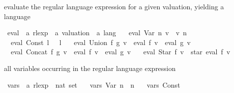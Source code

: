 \begin{isabellebody}
\begin{isamarkuptext}
evaluate the regular language expression for a given valuation, yielding a language%
\end{isamarkuptext}\isamarkuptrue%
\isamarkupfalse%
\ eval\ {\isacharcolon}{\kern0pt}{\isacharcolon}{\kern0pt}\ {\isachardoublequoteopen}{\isacharprime}{\kern0pt}a\ rlexp\ {\isasymRightarrow}\ {\isacharprime}{\kern0pt}a\ valuation\ {\isasymRightarrow}\ {\isacharprime}{\kern0pt}a\ lang{\isachardoublequoteclose}\ \isanewline
\ \ {\isachardoublequoteopen}eval\ {\isacharparenleft}{\kern0pt}Var\ n{\isacharparenright}{\kern0pt}\ v\ {\isacharequal}{\kern0pt}\ v\ n{\isachardoublequoteclose}\ {\isacharbar}{\kern0pt}\isanewline
\ \ {\isachardoublequoteopen}eval\ {\isacharparenleft}{\kern0pt}Const\ l{\isacharparenright}{\kern0pt}\ {\isacharunderscore}{\kern0pt}\ {\isacharequal}{\kern0pt}\ l{\isachardoublequoteclose}\ {\isacharbar}{\kern0pt}\isanewline
\ \ {\isachardoublequoteopen}eval\ {\isacharparenleft}{\kern0pt}Union\ f\ g{\isacharparenright}{\kern0pt}\ v\ {\isacharequal}{\kern0pt}\ eval\ f\ v\ {\isasymunion}\ eval\ g\ v{\isachardoublequoteclose}\ {\isacharbar}{\kern0pt}\isanewline
\ \ {\isachardoublequoteopen}eval\ {\isacharparenleft}{\kern0pt}Concat\ f\ g{\isacharparenright}{\kern0pt}\ v\ {\isacharequal}{\kern0pt}\ eval\ f\ v\ {\isacharat}{\kern0pt}{\isacharat}{\kern0pt}\ eval\ g\ v{\isachardoublequoteclose}\ {\isacharbar}{\kern0pt}\isanewline
\ \ {\isachardoublequoteopen}eval\ {\isacharparenleft}{\kern0pt}Star\ f{\isacharparenright}{\kern0pt}\ v\ {\isacharequal}{\kern0pt}\ star\ {\isacharparenleft}{\kern0pt}eval\ f\ v{\isacharparenright}{\kern0pt}{\isachardoublequoteclose}%
\begin{isamarkuptext}%
all variables occurring in the regular language expression%
\end{isamarkuptext}\isamarkuptrue%
\isamarkupfalse%
\ vars\ {\isacharcolon}{\kern0pt}{\isacharcolon}{\kern0pt}\ {\isachardoublequoteopen}{\isacharprime}{\kern0pt}a\ rlexp\ {\isasymRightarrow}\ nat\ set{\isachardoublequoteclose}\ \isanewline
\ \ {\isachardoublequoteopen}vars\ {\isacharparenleft}{\kern0pt}Var\ n{\isacharparenright}{\kern0pt}\ {\isacharequal}{\kern0pt}\ {\isacharbraceleft}{\kern0pt}n{\isacharbraceright}{\kern0pt}{\isachardoublequoteclose}\ {\isacharbar}{\kern0pt}\isanewline
\ \ {\isachardoublequoteopen}vars\ {\isacharparenleft}{\kern0pt}Const\ {\isacharunderscore}{\kern0pt}{\isacharparenright}{\kern0pt}\ {\isacharequal}{\kern0pt}\ {\isacharbraceleft}{\kern0pt}{\isacharbraceright}{\kern0pt}{\isachardoublequoteclose}\ {\isacharbar}{\kern0pt}\isanewline

\end{isabellebody}
